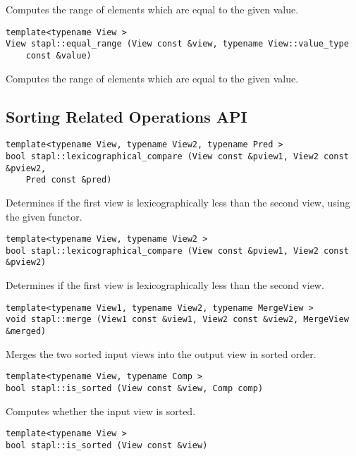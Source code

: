Computes the range of elements which are equal to the given value.

\begin{verbatim}
template<typename View >
View stapl::equal_range (View const &view, typename View::value_type
    const &value)
\end{verbatim}

Computes the range of elements which are equal to the given value.


\subsection{Sorting Related Operations API} \label{sec-sortrel-alg}

\begin{verbatim}
template<typename View, typename View2, typename Pred >
bool stapl::lexicographical_compare (View const &pview1, View2 const &pview2,
    Pred const &pred)
\end{verbatim}

Determines if the first view is lexicographically less than the second view, using the given functor.

\begin{verbatim}
template<typename View, typename View2 >
bool stapl::lexicographical_compare (View const &pview1, View2 const &pview2)
\end{verbatim}

Determines if the first view is lexicographically less than the second view.

\begin{verbatim}
template<typename View1, typename View2, typename MergeView >
void stapl::merge (View1 const &view1, View2 const &view2, MergeView &merged)
\end{verbatim}

Merges the two sorted input views into the output view in sorted order.

\begin{verbatim}
template<typename View, typename Comp >
bool stapl::is_sorted (View const &view, Comp comp)
\end{verbatim}

Computes whether the input view is sorted.

\begin{verbatim}
template<typename View >
bool stapl::is_sorted (View const &view)
\end{verbatim}

